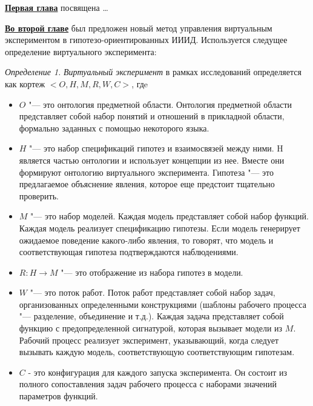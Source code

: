 

\underline{\textbf{Первая глава}} посвящена \dots


\underline{\textbf{Во второй главе}} был предложен новый метод управления виртуальным экспериментом 
в гипотезо-ориентированных ИИИД. Используется следущее определение виртуального эксперимента:

 \textit{Определение 1.} \textit{Виртуальный эксперимент} в рамках исследований определяется как 
кортеж $<O, H, M, R, W, C>$, гдe
\begin{itemize}
    \item $O$ "--- это онтология предметной области. Онтология предметной области представляет собой набор понятий и 
            отношений в прикладной области, формально заданных с помощью некоторого языка.
    \item $H$ "--- это набор спецификаций гипотез и взаимосвязей между ними. H является частью онтологии и использует 
            концепции из нее. Вместе они формируют онтологию виртуального эксперимента. Гипотеза "--- это предлагаемое 
            объяснение явления, которое еще предстоит тщательно проверить. 
    \item $M$ "--- это набор моделей. Каждая модель представляет собой набор функций. Каждая модель реализует 
            спецификацию гипотезы. Если модель генерирует ожидаемое поведение какого-либо явления, то говорят, что 
            модель и соответствующая гипотеза подтверждаются наблюдениями.
    \item $R: H \to M$ "--- это отображение из набора гипотез в модели.
    \item $W$ "--- это поток работ. Поток работ представляет собой набор задач, организованных определенными 
            конструкциями (шаблоны рабочего процесса "--- разделение, объединение и т.д.). Каждая задача представляет 
            собой функцию с предопределенной сигнатурой, которая вызывает модели из $M$. Рабочий процесс реализует 
            эксперимент, указывающий, когда следует вызывать каждую модель, соответствующую соответствующим гипотезам. 
    \item $C$ - это конфигурация для каждого запуска эксперимента. Он состоит из полного сопоставления задач 
            рабочего процесса с наборами значений параметров функций.
\end{itemize}


